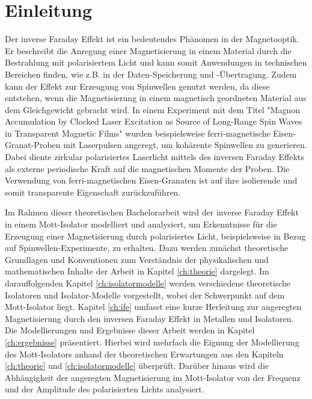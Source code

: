 \chapter{Einleitung}
\label{ch:einleitung}

Der inverse Faraday Effekt ist ein bedeutendes Phänomen in der Magnetooptik. Er beschreibt
die Anregung einer Magnetisierung in einem Material durch die Bestrahlung mit polarisiertem Licht
und kann somit Anwendungen in technischen Bereichen finden, wie z.B. in der Daten-Speicherung und -Übertragung.
Zudem kann der Effekt zur Erzeugung von Spinwellen genutzt werden, da diese entstehen,
wenn die Magnetisierung in einem magnetisch geordneten Material aus dem Gleichgewicht gebracht wird.
In einem Experiment mit dem Titel "Magnon Accumulation by Clocked Laser Excitation as Source of
Long-Range Spin Waves in Transparent Magnetic Films"\cite{jäckl} wurden beispielsweise ferri-magnetische
Eisen-Granat-Proben mit Laserpulsen angeregt, um kohärente Spinwellen zu generieren.
Dabei diente zirkular polarisiertes Laserlicht mittels des inversen Faraday Effekts als externe periodische Kraft auf
die magnetischen Momente der Proben.
Die Verwendung von ferri-magnetischen Eisen-Granaten ist auf ihre isolierende und somit transparente Eigenschaft
zurückzuführen.  \cite{hertel, jäckl}

Im Rahmen dieser theoretischen Bachelorarbeit wird der inverse Faraday Effekt in einem Mott-Isolator modelliert und analysiert, um
Erkenntnisse für die Erzeugung einer Magnetisierung durch polarisiertes Licht, beispielsweise in Bezug auf Spinwellen-Experimente, zu erhalten.
Dazu werden zunächst theoretische Grundlagen und Konventionen zum Verständnis der physikalischen und mathematischen Inhalte
der Arbeit in Kapitel \ref{ch:theorie} dargelegt. Im darauffolgenden Kapitel \ref{ch:isolatormodelle} werden verschiedene theoretische
Isolatoren und Isolator-Modelle vorgestellt, wobei der Schwerpunkt auf dem Mott-Isolator liegt.
Kapitel \ref{ch:ife} umfasst eine kurze Herleitung zur angeregten Magnetisierung durch den inversen Faraday Effekt in Metallen und Isolatoren.
Die Modellierungen und Ergebnisse dieser Arbeit werden in Kapitel \ref{ch:ergebnisse} präsentiert. Hierbei wird mehrfach die Eignung der Modellierung
des Mott-Isolators anhand der theoretischen Erwartungen aus den Kapiteln \ref{ch:theorie} und \ref{ch:isolatormodelle} überprüft.
Darüber hinaus wird die Abhängigkeit der angeregten Magnetisierung im Mott-Isolator von der Frequenz und der Amplitude des
polarisierten Lichts analysiert.
